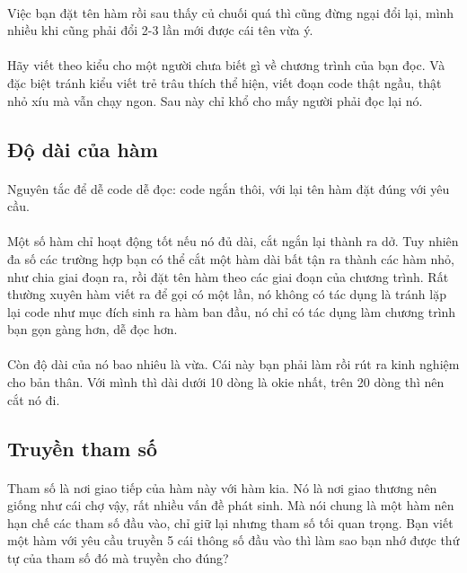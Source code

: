 \documentclass[12pt,a5paper]{book}
\begin{document}
\paragraph{}
Việc bạn đặt tên hàm rồi sau thấy củ chuối quá thì cũng đừng ngại đổi lại, mình nhiều khi cũng phải đổi 2-3 lần mới được cái tên vừa ý.
\paragraph{}
Hãy viết theo kiểu cho một người chưa biết gì về chương trình của bạn đọc. Và đặc biệt tránh kiểu viết trẻ trâu thích thể hiện, viết đoạn code thật ngầu, thật nhỏ xíu mà vẫn chạy ngon. Sau này chỉ khổ cho mấy người phải đọc lại nó.
\subsection{Độ dài của hàm}
\paragraph{}
Nguyên tắc để dễ code dễ đọc: code ngắn thôi, với lại tên hàm đặt đúng với yêu cầu. 
\paragraph{}
Một số hàm chỉ hoạt động tốt nếu nó đủ dài, cắt ngắn lại thành ra dở. Tuy nhiên đa số các trường hợp bạn có thể cắt một hàm dài bất tận ra thành các hàm nhỏ, như chia giai đoạn ra, rồi đặt tên hàm theo các giai đoạn của chương trình. Rất thường xuyên hàm viết ra để gọi có một lần, nó không có tác dụng là tránh lặp lại code như mục đích sinh ra hàm ban đầu, nó chỉ có tác dụng làm chương trình bạn gọn gàng hơn, dễ đọc hơn.
\paragraph{}
Còn độ dài của nó bao nhiêu là vừa. Cái này bạn phải làm rồi rút ra kinh nghiệm cho bản thân. Với mình thì dài dưới 10 dòng là okie nhất, trên 20 dòng thì nên cắt nó đi.
\subsection{Truyền tham số}
\paragraph{}
Tham số là nơi giao tiếp của hàm này với hàm kia. Nó là nơi giao thương nên giống như cái chợ vậy, rất nhiều vấn đề phát sinh. Mà nói chung là một hàm nên hạn chế các tham số đầu vào, chỉ giữ lại nhưng tham số tối quan trọng. Bạn viết một hàm với yêu cầu truyền 5 cái thông số đầu vào thì làm sao bạn nhớ được thứ tự của tham số đó mà truyền cho đúng?
\end{document}
